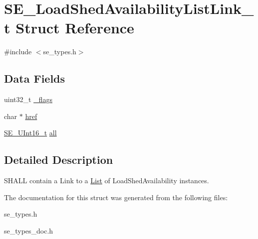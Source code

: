 \hypertarget{structSE__LoadShedAvailabilityListLink__t}{}\section{S\+E\+\_\+\+Load\+Shed\+Availability\+List\+Link\+\_\+t Struct Reference}
\label{structSE__LoadShedAvailabilityListLink__t}


{\ttfamily \#include $<$se\+\_\+types.\+h$>$}

\subsection*{Data Fields}
\begin{DoxyCompactItemize}
\item 
uint32\+\_\+t \hyperlink{group__LoadShedAvailabilityListLink_ga15ccf58f6147475c85154f31d26113f7}{\+\_\+flags}
\item 
char $\ast$ \hyperlink{group__LoadShedAvailabilityListLink_gae2e84f55b64ef90ea74bcddce389f77a}{href}
\item 
\hyperlink{group__UInt16_gac68d541f189538bfd30cfaa712d20d29}{S\+E\+\_\+\+U\+Int16\+\_\+t} \hyperlink{group__LoadShedAvailabilityListLink_gad05e8fa55aae27cf8d5534318a6612c5}{all}
\end{DoxyCompactItemize}


\subsection{Detailed Description}
S\+H\+A\+LL contain a Link to a \hyperlink{structList}{List} of Load\+Shed\+Availability instances. 

The documentation for this struct was generated from the following files\+:\begin{DoxyCompactItemize}
\item 
se\+\_\+types.\+h\item 
se\+\_\+types\+\_\+doc.\+h\end{DoxyCompactItemize}
